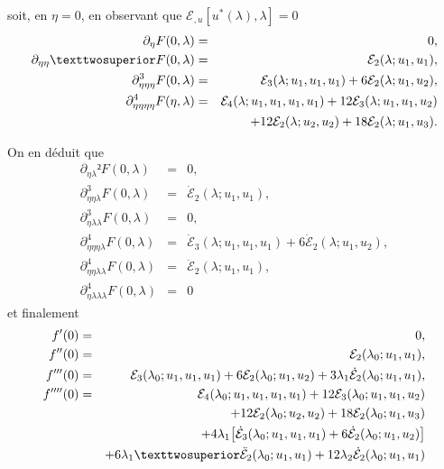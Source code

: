\documentclass[12pt, final]{amsart}
\begin{document}
soit, en \(\eta =0\), en observant que \(\mathcal E_{,u}[u^*(\lambda ), \lambda ]=0\)
\begin{eqnarray}
  \partial _\eta F(0, \lambda )&=&0,\\
  \partial _{\eta \eta }²F(0, \lambda )&=&\mathcal E_2(\lambda ; u_1, u_1),\\
  \partial _{\eta \eta \eta }^3F(0, \lambda )&=&\mathcal E_3(\lambda ;u_1, u_1, u_1)+6\mathcal E_2(\lambda ; u_1, u_2),\\
  \notag
  \partial _{\eta \eta \eta \eta }^4F(\eta , \lambda )&=&\mathcal E_4(\lambda ;u_1, u_1, u_1, u_1)+12\mathcal E_3(\lambda ; u_1, u_1, u_2)\\
            &&+12\mathcal E_2(\lambda ; u_2, u_2)+18\mathcal E_2(\lambda ; u_1, u_3).
\end{eqnarray}

On en déduit que
\begin{eqnarray}
  \partial _{\eta \lambda }²F(0, \lambda )&=&0,\\
  \partial _{\eta \eta \lambda }^3F(0, \lambda )&=&\dot{\mathcal E}_2(\lambda ; u_1, u_1),\\
  \partial _{\eta \lambda \lambda }^3F(0, \lambda )&=&0,\\
  \partial _{\eta \eta \eta \lambda }^4F(0, \lambda )&=&\dot{\mathcal E}_3(\lambda ; u_1, u_1, u_1)+6\dot{\mathcal E}_2(\lambda ; u_1, u_2),\\
  \partial _{\eta \eta \lambda \lambda }^4F(0, \lambda )&=&\ddot{\mathcal E}_2(\lambda ; u_1, u_1),\\
  \partial _{\eta \lambda \lambda \lambda }^4F(0, \lambda )&=&0
\end{eqnarray}
et finalement
\begin{eqnarray}
  f'(0)&=&0,\\
  f''(0)&=&\mathcal E_2(\lambda _0; u_1, u_1),\\
  f'''(0)&=&\mathcal E_3(\lambda _0;u_1, u_1, u_1)+6\mathcal E_2(\lambda _0; u_1, u_2)+3\lambda _1\dot{\mathcal E}_2(\lambda _0; u_1, u_1),\\
  \notag
  f''''(0)&=&\mathcal E_4(\lambda _0;u_1, u_1, u_1, u_1)+12\mathcal E_3(\lambda _0; u_1, u_1, u_2)\\
  \notag
          &&+12\mathcal E_2(\lambda _0; u_2, u_2)+18\mathcal E_2(\lambda _0; u_1, u_3)\\
  \notag
          &&+4\lambda _1\bigl[\dot{\mathcal E}_3(\lambda _0; u_1, u_1, u_1)+6\dot{\mathcal E}_2(\lambda _0; u_1, u_2)\bigr]\\
          &&+6\lambda _1²\ddot{\mathcal E}_2(\lambda _0; u_1, u_1)+12\lambda _2\dot{\mathcal E}_2(\lambda _0; u_1, u_1)
\end{eqnarray}
\end{document}
